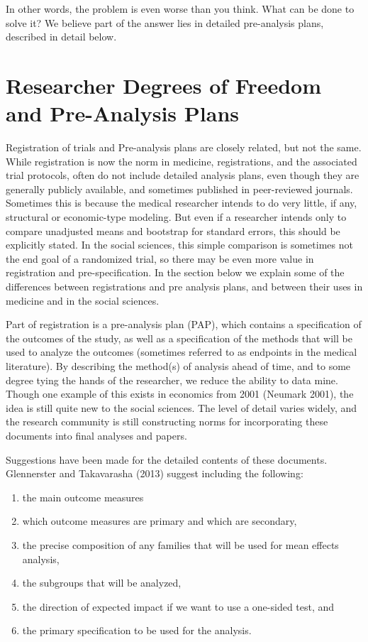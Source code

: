 \documentclass[12pt] {article}
\begin{document}
In other words, the problem is even worse than you think. What can be
done to solve it? We believe part of the answer lies in detailed
pre-analysis plans, described in detail below.

\section{Researcher Degrees of Freedom and Pre-Analysis
Plans}\label{researcher-degrees-of-freedom-and-pre-analysis-plans}

Registration of trials and Pre-analysis plans are closely related, but
not the same. While registration is now the norm in medicine,
registrations, and the associated trial protocols, often do not include
detailed analysis plans, even though they are generally publicly
available, and sometimes published in peer-reviewed journals. Sometimes
this is because the medical researcher intends to do very little, if
any, structural or economic-type modeling. But even if a researcher
intends only to compare unadjusted means and bootstrap for standard
errors, this should be explicitly stated. In the social sciences, this
simple comparison is sometimes not the end goal of a randomized trial,
so there may be even more value in registration and pre-specification.
In the section below we explain some of the differences between
registrations and pre analysis plans, and between their uses in medicine
and in the social sciences.

Part of registration is a pre-analysis plan (PAP), which contains a
specification of the outcomes of the study, as well as a specification
of the methods that will be used to analyze the outcomes (sometimes
referred to as endpoints in the medical literature). By describing the
method(s) of analysis ahead of time, and to some degree tying the hands
of the researcher, we reduce the ability to data mine. Though one
example of this exists in economics from 2001 (Neumark 2001), the idea
is still quite new to the social sciences. The level of detail varies
widely, and the research community is still constructing norms for
incorporating these documents into final analyses and papers.

Suggestions have been made for the detailed contents of these documents.
Glennerster and Takavarasha (2013) suggest including the following:

\begin{enumerate}
\def\labelenumi{\arabic{enumi}.}
\item
  the main outcome measures
\item
  which outcome measures are primary and which are secondary,
\item
  the precise composition of any families that will be used for mean
  effects analysis,
\item
  the subgroups that will be analyzed,
\item
  the direction of expected impact if we want to use a one-sided test,
  and
\item
  the primary specification to be used for the analysis.
\end{enumerate}
\end{document}
